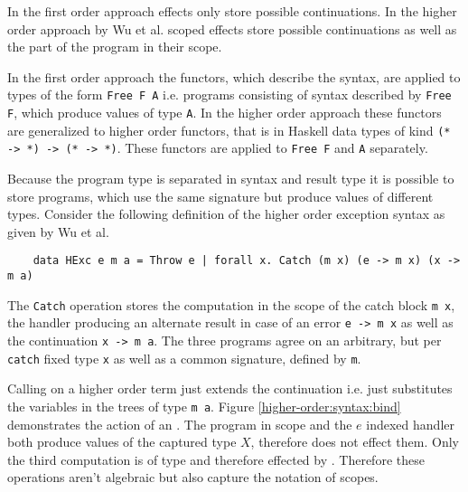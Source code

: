 In the first order approach effects only store possible continuations.
In the higher order approach by Wu et al. scoped effects store possible
continuations as well as the part of the program in their scope.

In the first order approach the functors, which describe the syntax, are applied
to types of the form \texttt{Free F A} i.e. programs consisting of syntax
described by \texttt{Free F}, which produce values of type \texttt{A}.
In the higher order approach these functors are generalized to higher order
functors, that is in Haskell data types of kind \texttt{(* -> *) -> (* -> *)}.
These functors are applied to \texttt{Free F} and \texttt{A} separately.

Because the program type is separated in syntax and result type it is possible
to store programs, which use the same signature but produce values of different
types.
Consider the following definition of the higher order exception syntax as given
by Wu et al.

\begin{verbatim}
    data HExc e m a = Throw e | forall x. Catch (m x) (e -> m x) (x -> m a)
\end{verbatim}
The \texttt{Catch} operation stores the computation in the scope of the catch
block \texttt{m x}, the handler producing an alternate result in case of an
error \texttt{e -> m x} as well as the continuation \texttt{x -> m a}.
The three programs agree on an arbitrary, but per \texttt{catch} fixed type
\texttt{x} as well as a common signature, defined by \texttt{m}.

Calling \AgdaFunction{>>=} on a higher order term just extends the continuation
i.e. just substitutes the variables in the trees of type \texttt{m a}.
Figure \ref{higher-order:syntax:bind} demonstrates the action of
\AgdaFunction{>>=} an .
The program in scope and the $e$ indexed handler both produce values of the
captured type $X$, therefore \AgdaFunction{>>=} does not effect them.
Only the third computation is of type  and therefore effected by
\AgdaFunction{>>=}.
Therefore these operations aren't algebraic but also capture the notation of
scopes.

